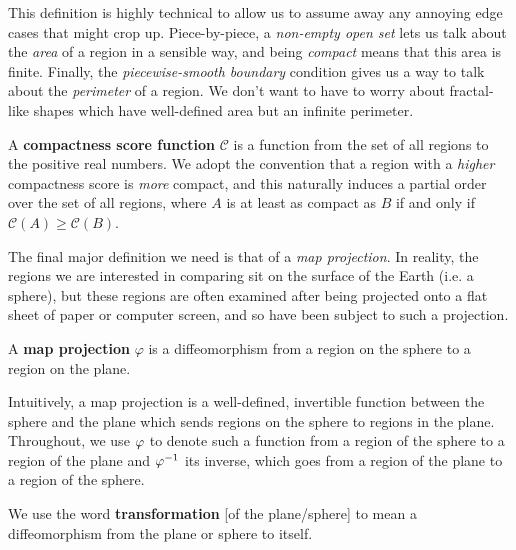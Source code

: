 This definition is highly technical to allow us to assume away any annoying edge 
cases that might crop up.  Piece-by-piece, a \textit{non-empty open set} lets us 
talk about the \textit{area} of a region in a sensible way, and being \textit{compact} means that this area is finite.  Finally, the 
\textit{piecewise-smooth boundary} condition gives us a way to talk about the \textit{perimeter} 
of a region.  We don't want to have to worry about fractal-like shapes which have well-defined 
area but an infinite perimeter.










\begin{definition}
  A \textbf{compactness score function} $\mathcal{C}$ is a function from
  the set of all regions to the positive real numbers.  We adopt the
  convention that a region with a \textit{higher} compactness score is
  \textit{more} compact, and this naturally induces a partial order over
  the set of all regions, where $A$ is at least as compact as $B$ if and
  only if $\mathcal{C}(A)\geq \mathcal{C}(B)$.
\end{definition}

The final major definition we need is that of a \textit{map
projection}.  In reality, the regions we are interested in comparing
sit on the surface of the Earth (i.e. a sphere), but these regions are
often examined after being projected onto a flat sheet of paper or
computer screen, and so have been subject to such a projection.

\begin{definition}
  A \textbf{map projection} $\varphi$ is a 
  diffeomorphism from a region on the sphere to a region on the 
  plane. 
\end{definition}

Intuitively, a map projection is a well-defined, invertible function between the sphere and the plane which sends regions on the sphere to regions in the plane.  Throughout, we use $\varphi$ to denote such a function from a region of the sphere 
to a region of the plane and $\varphi^{-1}$ its inverse, which goes from a region of the plane to a region of the sphere. 

\begin{definition}
  We use the word \textbf{transformation} [of the plane/sphere] to mean
   a diffeomorphism from the plane or sphere to itself.
\end{definition}

